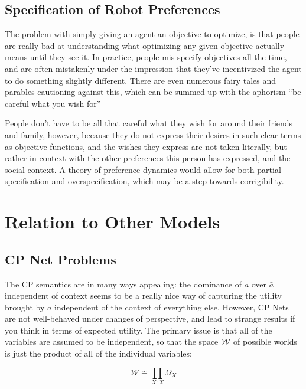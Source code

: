 \documentclass{article}
\theoremstyle{plain}
\theoremstyle{definition}
\theoremstyle{remark}
\begin{document}
	

	
	\subsection{Specification of Robot Preferences}
	The problem with simply giving an agent an objective to optimize, is that people are really bad at understanding what optimizing any given objective actually means until they see it. In practice, people mis-specify objectives all the time, and are often mistakenly under the impression that they've incentivized the agent to do something slightly different. There are even numerous fairy tales and parables cautioning against this, which can be summed up with the aphorism ``be careful what you wish for''
	
	People don't have to be all that careful what they wish for around their friends and family, however, because they do not express their desires in such clear terms as objective functions, and the wishes they express are not taken literally, but rather in context with the other preferences this person has expressed, and the social context. A theory of preference dynamics would allow for both partial specification and overspecification, which may be a step towards corrigibility.
	
	\section{Relation to Other Models}
			
	\subsection{CP Net Problems}
	The CP semantics are in many ways appealing: the dominance of $a$ over $\bar a$ independent of context seems to be a really nice way of capturing the utility brought by $a$ independent of the context of everything else. However, CP Nets are not well-behaved under changes of perspective, and lead to strange results if you think in terms of expected utility. The primary issue is that all of the variables are assumed to be independent, so that the space $\cal W$ of possible worlds is just the product of all of the individual variables:
	
	\[ \mathcal W \cong \prod_{X: \mathcal X} \Omega_X \] 
	
\end{document}

